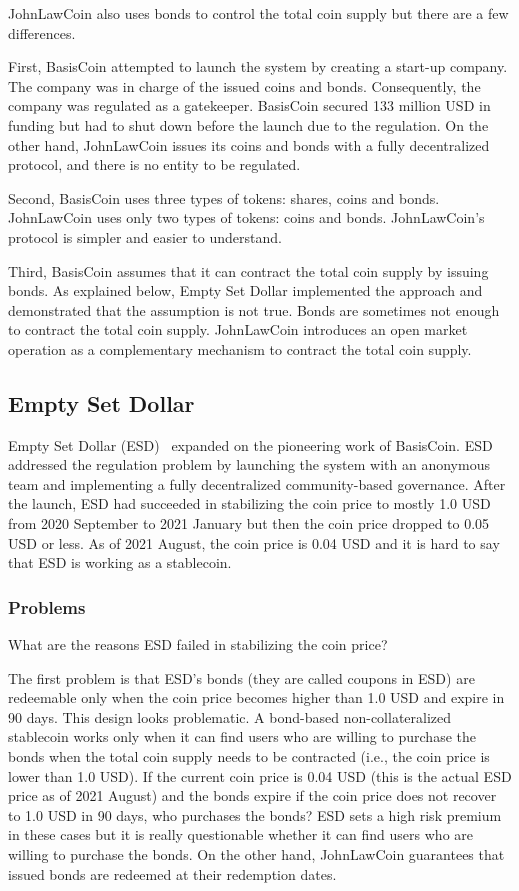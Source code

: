 \documentclass[dvipdfmx,a4paper]{article}
\begin{document}
JohnLawCoin also uses bonds to control the total coin supply but there are a few differences.

First, BasisCoin attempted to launch the system by creating a start-up company. The company was in charge of the issued coins and bonds. Consequently, the company was regulated as a gatekeeper. BasisCoin secured 133 million USD in funding but had to shut down before the launch due to the regulation. On the other hand, JohnLawCoin issues its coins and bonds with a fully decentralized protocol, and there is no entity to be regulated.

Second, BasisCoin uses three types of tokens: shares, coins and bonds. JohnLawCoin uses only two types of tokens: coins and bonds. JohnLawCoin's protocol is simpler and easier to understand.

Third, BasisCoin assumes that it can contract the total coin supply by issuing bonds. As explained below, Empty Set Dollar implemented the approach and demonstrated that the assumption is not true. Bonds are sometimes not enough to contract the total coin supply. JohnLawCoin introduces an open market operation as a complementary mechanism to contract the total coin supply.

\subsection{Empty Set Dollar}

Empty Set Dollar (ESD)~\cite{emptysetdollar} expanded on the pioneering work of BasisCoin. ESD addressed the regulation problem by launching the system with an anonymous team and implementing a fully decentralized community-based governance. After the launch, ESD had succeeded in stabilizing the coin price to mostly 1.0 USD from 2020 September to 2021 January but then the coin price dropped to 0.05 USD or less. As of 2021 August, the coin price is 0.04 USD and it is hard to say that ESD is working as a stablecoin.

\subsubsection{Problems}

What are the reasons ESD failed in stabilizing the coin price?

The first problem is that ESD's bonds (they are called coupons in ESD) are redeemable only when the coin price becomes higher than 1.0 USD and expire in 90 days. This design looks problematic. A bond-based non-collateralized stablecoin works only when it can find users who are willing to purchase the bonds when the total coin supply needs to be contracted (i.e., the coin price is lower than 1.0 USD). If the current coin price is 0.04 USD (this is the actual ESD price as of 2021 August) and the bonds expire if the coin price does not recover to 1.0 USD in 90 days, who purchases the bonds? ESD sets a high risk premium in these cases but it is really questionable whether it can find users who are willing to purchase the bonds. On the other hand, JohnLawCoin guarantees that issued bonds are redeemed at their redemption dates.
\end{document}
